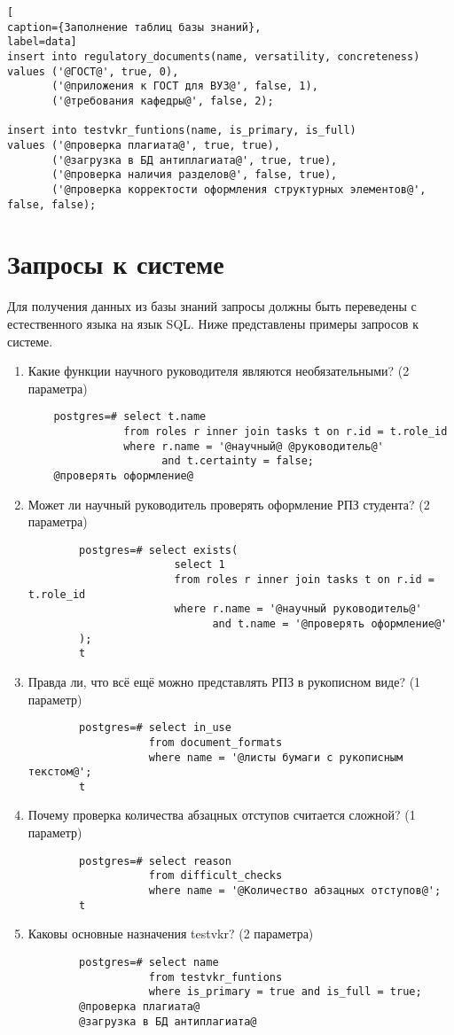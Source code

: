 \begin{lstlisting}[
caption={Заполнение таблиц базы знаний},
label=data]
insert into regulatory_documents(name, versatility, concreteness)
values ('@ГОСТ@', true, 0),
       ('@приложения к ГОСТ для ВУЗ@', false, 1),
       ('@требования кафедры@', false, 2);

insert into testvkr_funtions(name, is_primary, is_full)
values ('@проверка плагиата@', true, true),
       ('@загрузка в БД антиплагиата@', true, true),
       ('@проверка наличия разделов@', false, true),
       ('@проверка корректости оформления структурных элементов@', false, false);
\end{lstlisting}

\section{Запросы к системе}

Для получения данных из базы знаний запросы должны быть переведены с естественного языка на язык SQL. Ниже представлены примеры запросов к системе.

\begin{enumerate}[label*=\arabic*.]
	\item Какие функции научного руководителя являются необязательными? (2 параметра)
	\begin{lstlisting}
	postgres=# select t.name 
	           from roles r inner join tasks t on r.id = t.role_id 
	           where r.name = '@научный@ @руководитель@' 
	                 and t.certainty = false;
	@проверять оформление@
	\end{lstlisting}
	\item Может ли научный руководитель проверять оформление РПЗ студента? (2 параметра)
	\begin{lstlisting}
		postgres=# select exists(
		               select 1
		               from roles r inner join tasks t on r.id = t.role_id 
		               where r.name = '@научный руководитель@' 
		                     and t.name = '@проверять оформление@'
		);
		t
	\end{lstlisting}
	\item Правда ли, что всё ещё можно представлять РПЗ в рукописном виде? (1 параметр)
	\begin{lstlisting}
		postgres=# select in_use 
		           from document_formats 
		           where name = '@листы бумаги с рукописным текстом@';
		t
	\end{lstlisting}
	\item Почему проверка количества абзацных отступов считается сложной? (1 параметр)
	\begin{lstlisting}
		postgres=# select reason 
		           from difficult_checks 
		           where name = '@Количество абзацных отступов@';
		t
	\end{lstlisting}
	\item Каковы основные назначения testvkr? (2 параметра)
	\begin{lstlisting}
		postgres=# select name 
		           from testvkr_funtions 
		           where is_primary = true and is_full = true;
		@проверка плагиата@
		@загрузка в БД антиплагиата@
	\end{lstlisting}
\end{enumerate}

\clearpage
